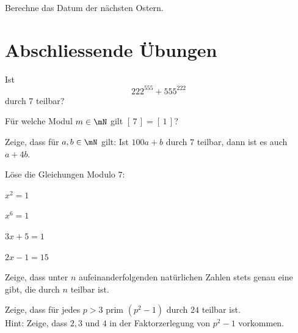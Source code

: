 \documentclass[%
11pt,%
twoside,%
titlepage,%
german,%
headsepline%
]{scrartcl}
\begin{document}
\begin{ueb}
Berechne das Datum der nächsten Ostern.
\end{ueb}

\section{Abschliessende Übungen}

\begin{ueb}
Ist
$$222^{555}+555^{222}$$
durch $7$ teilbar?
\end{ueb}

\begin{ueb}[Äquivalenz]
Für welche Modul $m\in\mN$ gilt $[\,7\,]=[\,1\,]$?
\end{ueb}

\begin{ueb}[variabel]
Zeige, dass für $a,b\in\mN$ gilt: Ist $100a+b$ durch $7$ teilbar, dann ist es auch $a+4b$.
\end{ueb}

\begin{ueb}[Gleichungen]
Löse die Gleichungen Modulo $7$:

\begin{minipage}{3.5cm}
\begin{enumeratea}
\item $x^2=1$
\item $x^6=1$
\end{enumeratea}
\end{minipage}
\begin{minipage}{3.5cm}
\begin{enumeratea}
\addtocounter{enumi}{2}
\item $3x+5=1$
\item $2x-1=15$
\end{enumeratea}
\end{minipage}
\end{ueb}

\begin{ueb}
Zeige, dass unter $n$ aufeinanderfolgenden natürlichen Zahlen stets genau eine gibt, die durch $n$ teilbar ist.
\end{ueb}

\begin{ueb}
Zeige, dass für jedes $p>3$ prim $(p^2-1)$ durch $24$ teilbar ist.
\footnotesize \\Hint: Zeige, dass $2,3$ und $4$ in der Faktorzerlegung von $p^2-1$ vorkommen.
\end{ueb}

\cleardoublepage
\listoffigures
%
%
\end{document}
